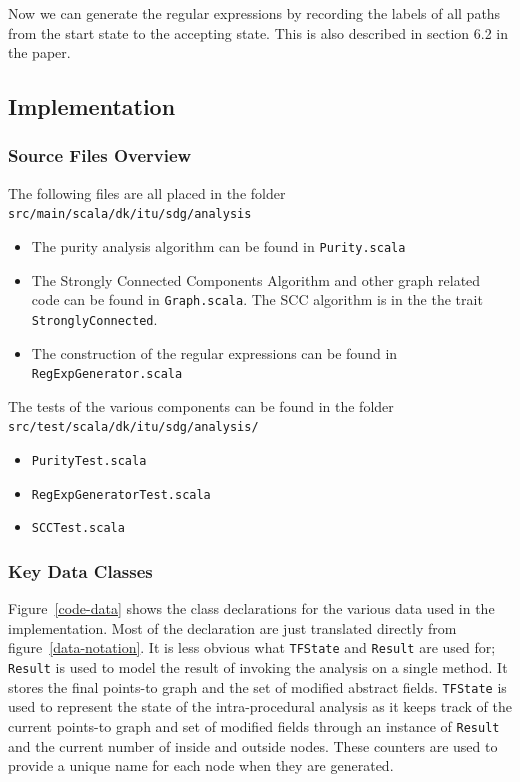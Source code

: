 \documentclass[11pt]{exam}
\begin{document}
Now we can generate the regular expressions by recording the labels of
all paths from the start state to the accepting state. This is also
described in section 6.2 in the paper.

\subsection{Implementation}

\subsubsection*{Source Files Overview}

The following files are all placed in the folder
\texttt{src/main/scala/dk/itu/sdg/analysis}

\begin{itemize}
  \setlength{\itemsep}{1pt}
  \setlength{\parskip}{0pt}
  \item The purity analysis algorithm can be found in \texttt{Purity.scala}
  \item The Strongly Connected Components Algorithm and other graph related code can be found in \texttt{Graph.scala}. The SCC algorithm is in the the trait \texttt{StronglyConnected}.
  \item The construction of the regular expressions can be
  found in \texttt{RegExpGenerator.scala}
\end{itemize}

The tests of the various components can be found in the folder
\texttt{src/test/scala/dk/itu/sdg/analysis/}

\begin{itemize}
  \setlength{\itemsep}{1pt}
  \setlength{\parskip}{0pt}
  \item \texttt{PurityTest.scala}
  \item \texttt{RegExpGeneratorTest.scala}
  \item \texttt{SCCTest.scala}
\end{itemize}

\subsubsection*{Key Data Classes}

Figure~\ref{code-data} shows the class declarations for the various
data used in the implementation. Most of the  declaration are just
translated directly from figure~\ref{data-notation}. It is less
obvious what \texttt{TFState} and \texttt{Result} are used for;
\texttt{Result} is used to model the result of invoking the analysis on a
single method. It stores the final points-to graph and the set of
modified abstract fields. \texttt{TFState}  is used to represent the
state of the intra-procedural analysis as it  keeps track of the
current points-to graph and set of modified fields through an instance
of \texttt{Result} and the current number of inside and outside
nodes. These counters are used to provide a unique name for each node
when they are generated.
\end{document}
